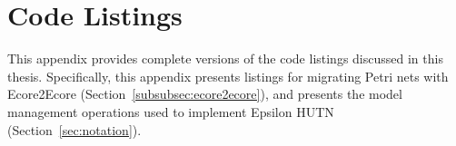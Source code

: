 
\chapter{Code Listings}
\label{CodeListings}

This appendix provides complete versions of the code listings discussed in this thesis. Specifically, this appendix presents listings for migrating Petri nets with Ecore2Ecore (Section~\ref{subsubsec:ecore2ecore}), and presents the model management operations used to implement Epsilon HUTN (Section~\ref{sec:notation}).



